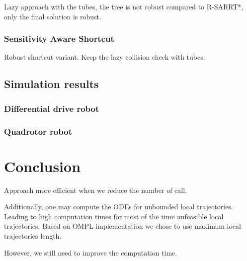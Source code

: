 Lazy approach with the tubes, the tree is not robust compared to R-SARRT*, only the final solution is robust.
\subsubsection{Sensitivity Aware Shortcut}
Robust shortcut variant.
Keep the lazy collision check with tubes.

\subsection{Simulation results}
\subsubsection{Differential drive robot}
\subsubsection{Quadrotor robot}

\section{Conclusion}\label{sec:concl}
Approach more efficient when we reduce the number of call. 

Additionally, one may compute the ODEs for unbounded local trajectories. 
Leading to high computation times for most of the time unfeasible local trajectories. 
Based on OMPL implementation we chose to use maximum local trajectories length.

However, we still need to improve the computation time.
